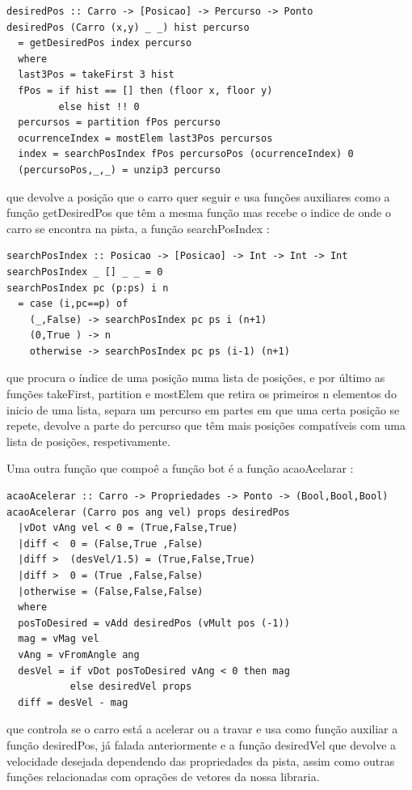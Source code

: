 \documentclass[a4paper]{report} %
\begin{document}
\begin{verbatim}
desiredPos :: Carro -> [Posicao] -> Percurso -> Ponto
desiredPos (Carro (x,y) _ _) hist percurso
  = getDesiredPos index percurso
  where
  last3Pos = takeFirst 3 hist
  fPos = if hist == [] then (floor x, floor y)
         else hist !! 0
  percursos = partition fPos percurso
  ocurrenceIndex = mostElem last3Pos percursos
  index = searchPosIndex fPos percursoPos (ocurrenceIndex) 0
  (percursoPos,_,_) = unzip3 percurso
\end{verbatim}
que devolve a posição que o carro quer seguir e usa funções auxiliares como a função getDesiredPos que têm a mesma função mas recebe o indice de onde o carro se encontra na pista, a função searchPosIndex : 

\begin{verbatim}
searchPosIndex :: Posicao -> [Posicao] -> Int -> Int -> Int
searchPosIndex _ [] _ _ = 0
searchPosIndex pc (p:ps) i n
  = case (i,pc==p) of
    (_,False) -> searchPosIndex pc ps i (n+1)
    (0,True ) -> n
    otherwise -> searchPosIndex pc ps (i-1) (n+1)
\end{verbatim}
que procura o índice de uma posição numa lista de posições, e por último as funções takeFirst, partition e mostElem que retira os primeiros n elementos do inicio de uma lista, separa um percurso em partes em que uma certa posição se repete, devolve a parte do percurso que têm mais posições compatíveis com
uma lista de posições, respetivamente.

Uma outra função que compoê a função bot é a função acaoAcelarar :

\begin{verbatim}
acaoAcelerar :: Carro -> Propriedades -> Ponto -> (Bool,Bool,Bool)
acaoAcelerar (Carro pos ang vel) props desiredPos
  |vDot vAng vel < 0 = (True,False,True)
  |diff <  0 = (False,True ,False)
  |diff >  (desVel/1.5) = (True,False,True)
  |diff >  0 = (True ,False,False)
  |otherwise = (False,False,False)
  where
  posToDesired = vAdd desiredPos (vMult pos (-1))  
  mag = vMag vel
  vAng = vFromAngle ang
  desVel = if vDot posToDesired vAng < 0 then mag
           else desiredVel props
  diff = desVel - mag
\end{verbatim}
que controla se o carro está a acelerar ou a travar e usa como função auxiliar a função desiredPos, já falada anteriormente e a função desiredVel que devolve a velocidade desejada dependendo das propriedades da pista, assim como outras funções relacionadas com oprações de vetores da nossa libraria.
\end{document}
